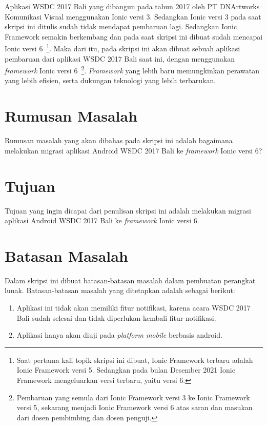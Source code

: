 Aplikasi WSDC 2017 Bali yang dibangun pada tahun 2017 oleh PT DNArtworks Komunikasi Visual menggunakan Ionic versi 3. Sedangkan Ionic versi 3 pada saat skripsi ini ditulis sudah tidak mendapat pembaruan lagi. Sedangkan Ionic Framework semakin berkembang dan pada saat skripsi ini dibuat sudah mencapai Ionic versi 6~\footnote{Saat pertama kali topik skripsi ini dibuat, Ionic Framework terbaru adalah Ionic Framework versi 5. Sedangkan pada bulan Desember 2021 Ionic Framework mengeluarkan versi terbaru, yaitu versi 6.}. Maka dari itu, pada skripsi ini akan dibuat sebuah aplikasi pembaruan dari aplikasi WSDC 2017 Bali saat ini, dengan menggunakan \textit{framework} Ionic versi 6~\footnote{Pembaruan yang semula dari Ionic Framework versi 3 ke Ionic Framework versi 5, sekarang menjadi Ionic Framework versi 6 atas saran dan masukan dari dosen pembimbing dan dosen penguji.}. \textit{Framework} yang lebih baru memungkinkan perawatan yang lebih efisien, serta dukungan teknologi yang lebih terbarukan.

\section{Rumusan Masalah}
\label{sec:rumusan}
Rumusan masalah yang akan dibahas pada skripsi ini adalah bagaimana melakukan migrasi aplikasi Android WSDC 2017 Bali ke {\it framework} Ionic versi 6?

\section{Tujuan}
\label{sec:tujuan}
Tujuan yang ingin dicapai dari penulisan skripsi ini adalah melakukan migrasi aplikasi Android WSDC 2017 Bali ke {\it framework} Ionic versi 6.

\newpage

\section{Batasan Masalah}
\label{sec:batasan}
Dalam skripsi ini dibuat batasan-batasan masalah dalam pembuatan perangkat lunak.  Batasan-batasan masalah yang ditetapkan adalah sebagai berikut:

\begin{enumerate}
    \item Aplikasi ini tidak akan memiliki fitur notifikasi, karena acara WSDC 2017 Bali sudah selesai dan tidak diperlukan kembali fitur notifikasi.
    \item Aplikasi hanya akan diuji pada \textit{platform mobile} berbasis android. 
\end{enumerate}


